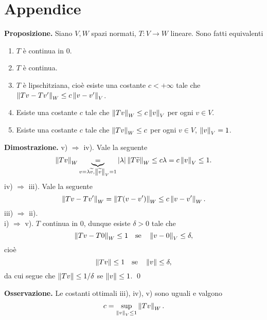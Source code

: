 %
%

\section{Appendice}

\textbf{Proposizione.} Siano $V,W$ spazi normati, $T \colon V \to W$ lineare.
Sono fatti equivalenti
\begin{enumerate}
\item $T$ è continua in $0$.

\item $T$ è continua.

\item $T$ è lipschitziana, cioè esiste una costante $c < +\infty$ tale che $\left\lVert Tv - Tv' \right\rVert_W \leq c \left\lVert v - v' \right\rVert_V$.

\item Esiste una costante $c$ tale che $\left\lVert Tv \right\rVert_W \leq c \left\lVert v \right\rVert_V$ per ogni $v \in V$.

\item Esiste una costante $c$ tale che $\left\lVert Tv \right\rVert_W \leq c$ per ogni $v \in V$, $\left\lVert v \right\rVert_V = 1$.
\end{enumerate}

\textbf{Dimostrazione.}
v) $\Rightarrow$ iv). Vale la seguente
%
$$
\left\lVert Tv \right\rVert_W \underbrace{=}_{v = \lambda \widetilde{v}, \left\lVert \widetilde{v} \right\rVert_V = 1} \left| \lambda \right| \left\lVert T \widetilde{v} \right\rVert_W \leq c \lambda = c \left\lVert v \right\rVert_V \leq 1.
$$
%
iv) $\Rightarrow$ iii). Vale la seguente
%
$$
\left\lVert Tv - Tv' \right\rVert_W = \left\lVert T(v - v') \right\rVert_W \leq c \left\lVert v - v' \right\rVert_W.
$$
%
iii) $\Rightarrow$ ii). \\
i) $\Rightarrow$ v). $T$ continua in $0$, dunque esiste $\delta > 0$ tale che
%
$$
\left\lVert Tv - T0 \right\rVert_W \leq 1 \quad \text{se} \quad \left\lVert v - 0 \right\rVert_V \leq \delta,
$$
%
cioè
%
$$
\left\lVert Tv \right\rVert \leq 1 \quad \text{se} \quad \left\lVert v \right\rVert \leq \delta,
$$
%
da cui segue che $\left\lVert Tv \right\rVert \leq 1/ \delta$ se $\left\lVert v \right\rVert \leq 1$.
\qed

\textbf{Osservazione.} Le costanti ottimali iii), iv), v) sono uguali e valgono
%
$$
c = \sup_{\left\lVert v \right\rVert_V \leq 1} \left\lVert Tv \right\rVert_W.
$$
%

